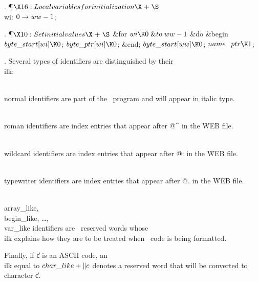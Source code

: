 . \P$\X16:Local variables for initialization\X\mathrel{+}\S$\6
\4\\{wi}: $0\to\\{ww}-1$;\par
\fi

. \P$\X10:Set initial values\X\mathrel{+}\S$\6
\&{for} $\\{wi}\K0\mathrel{\&{to}}\\{ww}-1$ \1\&{do}\6
\&{begin} $\\{byte\_start}[\\{wi}]\K0$;\5
$\\{byte\_ptr}[\\{wi}]\K0$;\6
\&{end};\2\6
$\\{byte\_start}[\\{ww}]\K0$;\6
$\\{name\_ptr}\K1$;\par
\fi

. Several types of identifiers are distinguished by their \\{ilk}:

\yskip\hang \\{normal} identifiers are part of the \PASCAL\ program and
will appear in italic type.

\yskip\hang \\{roman} identifiers are index entries that appear after
\.{@\^} in the \.{WEB} file.

\yskip\hang \\{wildcard} identifiers are index entries that appear after
\.{@:} in the \.{WEB} file.

\yskip\hang \\{typewriter} identifiers are index entries that appear after
\.{@.} in the \.{WEB} file.

\yskip\hang \\{array\_like}, \\{begin\_like}, \dots, \\{var\_like}
identifiers are \PASCAL\ reserved words whose \\{ilk} explains how they are
to be treated when \PASCAL\ code is being formatted.

\yskip\hang Finally, if \|c is an ASCII code, an \\{ilk} equal to
$\\{char\_like}+\|c$ denotes a reserved word that will be converted to
character
\|c.

